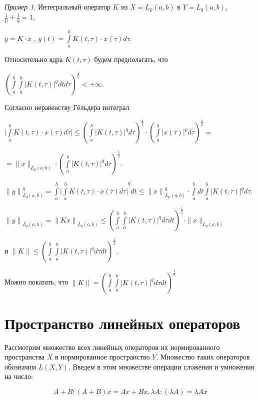 \documentclass[12pt,a4paper,titlepage, oneside]{book}
\theoremstyle{definition}
\theoremstyle{plain}
\theoremstyle{remark}
\theoremstyle{remark}
\newtheorem*{example}{Пример}
\theoremstyle{remark}
\theoremstyle{remark}
\theoremstyle{plain}
\theoremstyle{plain}
\begin{document}
\begin{example}
Интегральный оператор $K$ из $X=L_p(a,b)$ в $Y=L_q(a,b)$, $
\frac{1}{p}+\frac{1}{q}=1$,
\begin{center}
$y=K\cdot x$ ,  $ y(t)=\int\limits_a^b K(t,\tau)\cdot x(\tau)d\tau$.
\end{center}

Относительно ядра $K(t,\tau)$ будем предполагать, что 
\begin{center}
${(\int\limits_a^b \int\limits_a^b {\vert K(t,\tau)\vert} ^q dtd\tau)^\frac{1}{q}} <+\infty$.
\end{center}

Согласно неравенству Гёльдера интеграл 
\begin{center}
$\vert \int\limits_a^b K(t,\tau)\cdot x(\tau)d\tau \vert \leq (\int\limits_a^b {\vert K(t,\tau)\vert} ^q d\tau)^\frac{1}{q} \cdot {(\int\limits_a^b {\vert x(\tau)\vert} ^p d\tau)}^\frac{1}{p}=$

$= \parallel x \parallel _{L_p(a,b)}\cdot (\int\limits_a^b {\vert K(t,\tau)\vert} ^q d\tau)^\frac{1}{q}$.

${\parallel y \parallel}^q _{L_q(a,b)}=\int\limits_a^b {\vert \int\limits_a^b K(t,\tau)\cdot x(\tau)d\tau \vert}^{q} dt\leq {\parallel x \parallel}^q _{L_p(a,b)} \cdot \int\limits_a^b dt \int\limits_a^b {\vert K(t,\tau)\vert} ^q d\tau$.

${\parallel y \parallel}_{L_q(a,b)}=
{\parallel Kx\parallel}_{L_q(a,b)} \leq {(\int\limits_a^b \int\limits_a^b {\vert K(t,\tau)\vert} ^q d\tau dt)^\frac{1}{q}}\cdot \parallel x \parallel _{L_p(a,b)} $ 
\end{center}
и $\parallel K \parallel \leq {(\int\limits_a^b \int\limits_a^b {\vert K(t,\tau)\vert} ^q d\tau dt)^\frac{1}{q}}$.

Можно показать, что $\parallel K \parallel = 
{(\int\limits_a^b \int\limits_a^b {\vert K(t,\tau)\vert} ^q d\tau dt)^\frac{1}{q}}$
\end{example}

\section{Пространство линейных операторов}
Рассмотрим множество всех линейных операторов их нормированного пространства $X$ в нормированное пространство $Y$. Множество таких операторов обозначим $L(X,Y)$. Введем в этом множестве операции сложения и умножения на число:

$$A+B: (A+B)x = Ax+Bx, \lambda A: (\lambda A) = \lambda Ax$$
\end{document}

